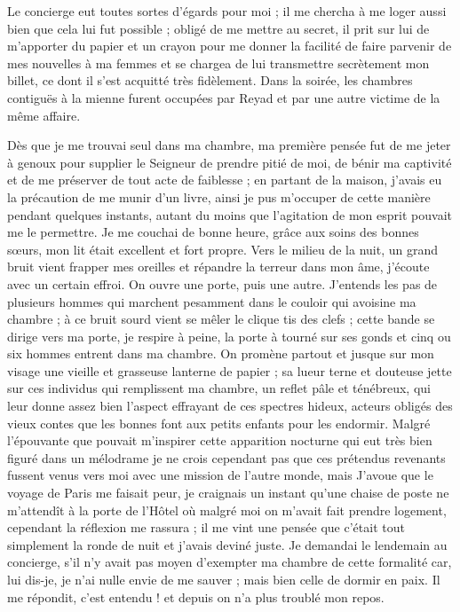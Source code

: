 \documentclass[11pt,a4paper]{report}
\begin{document}
Le concierge eut toutes sortes d'égards pour moi ; il me chercha à me loger aussi bien que cela lui fut possible ; obligé de me mettre au secret, il prit sur lui de m'apporter du papier et un crayon pour me donner la facilité de faire parvenir de mes nouvelles à ma femmes et se chargea de lui transmettre secrètement mon billet, ce dont il s'est acquitté très fidèlement. Dans la soirée, les chambres contiguës à la mienne furent occupées par Reyad et par une autre victime de la même affaire.

Dès que je me trouvai seul dans ma chambre, ma première pensée fut de me jeter à genoux pour supplier le Seigneur de prendre pitié de moi, de bénir ma captivité et de me préserver de tout acte de faiblesse ; en partant de la maison, j'avais eu la précaution de me munir d'un livre, ainsi je pus m'occuper de cette manière pendant quelques instants, autant du moins que l'agitation de mon esprit pouvait me le permettre. Je me couchai de bonne heure, grâce aux soins des bonnes sœurs, mon lit était excellent et fort propre. Vers le milieu de la nuit, un grand bruit vient frapper mes oreilles et répandre la terreur dans mon âme, j'écoute avec un certain effroi. On ouvre une porte, puis une autre. J'entends les pas de plusieurs hommes qui marchent pesamment dans le couloir qui avoisine ma chambre ; à ce bruit sourd vient se mêler le clique tis des clefs ; cette bande se dirige vers ma porte, je respire à peine, la porte à tourné sur ses gonds et cinq ou six hommes entrent dans ma chambre. On promène partout et jusque sur mon visage une vieille et grasseuse lanterne de papier ; sa lueur terne et douteuse jette sur ces individus qui remplissent ma chambre, un reflet pâle et ténébreux, qui leur donne assez bien l'aspect effrayant de ces spectres hideux, acteurs obligés des vieux contes que les bonnes font aux petits enfants pour les endormir. Malgré l'épouvante que pouvait m'inspirer cette apparition nocturne qui eut très bien figuré dans un mélodrame je ne crois cependant pas que ces prétendus revenants fussent venus vers moi avec une mission de l'autre monde, mais J'avoue que le voyage de Paris me faisait peur, je craignais un instant qu'une chaise de poste ne m'attendît à la porte de l'Hôtel où malgré moi on m'avait fait prendre logement, cependant la réflexion me rassura ; il me vint une pensée que c'était tout simplement la ronde de nuit et j'avais deviné juste. Je demandai le lendemain au concierge, s'il n'y avait pas moyen d'exempter ma chambre de cette formalité car, lui dis-je, je n'ai nulle envie de me sauver ; mais bien celle de dormir en paix. Il me répondit, c'est entendu ! et depuis on n'a plus troublé mon repos.
\end{document}
